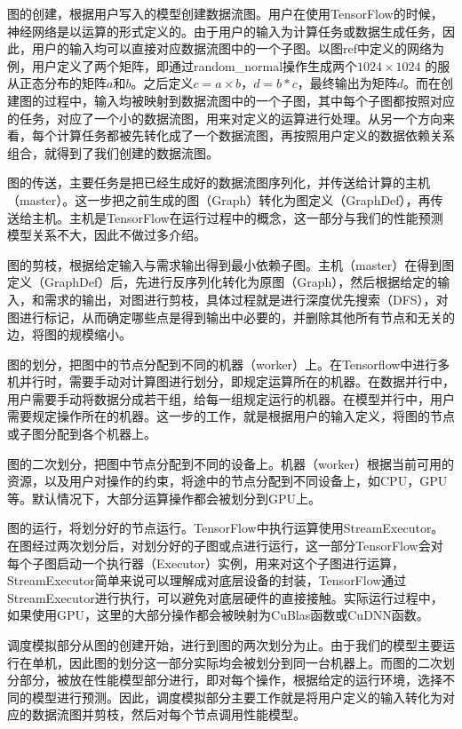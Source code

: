     图的创建，根据用户写入的模型创建数据流图。用户在使用TensorFlow的时候，神经网络是以运算的形式定义的。由于用户的输入为计算任务或数据生成任务，因此，用户的输入均可以直接对应数据流图中的一个子图。以图ref中定义的网络为例，用户定义了两个矩阵，即通过random\_normal操作生成两个$ 1024 \times 1024 $ 的服从正态分布的矩阵$ a $和$ b $。之后定义$ c = a \times b $，$ d = b * c $，最终输出为矩阵$ d $。而在创建图的过程中，输入均被映射到数据流图中的一个子图，其中每个子图都按照对应的任务，对应了一个小的数据流图，用来对定义的运算进行处理。从另一个方向来看，每个计算任务都被先转化成了一个数据流图，再按照用户定义的数据依赖关系组合，就得到了我们创建的数据流图。
    
    图的传送，主要任务是把已经生成好的数据流图序列化，并传送给计算的主机（master）。这一步把之前生成的图（Graph）转化为图定义（GraphDef），再传送给主机。主机是TensorFlow在运行过程中的概念，这一部分与我们的性能预测模型关系不大，因此不做过多介绍。
    
    图的剪枝，根据给定输入与需求输出得到最小依赖子图。主机（master）在得到图定义（GraphDef）后，先进行反序列化转化为原图（Graph），然后根据给定的输入，和需求的输出，对图进行剪枝，具体过程就是进行深度优先搜索（DFS），对图进行标记，从而确定哪些点是得到输出中必要的，并删除其他所有节点和无关的边，将图的规模缩小。
    
    图的划分，把图中的节点分配到不同的机器（worker）上。在Tensorflow中进行多机并行时，需要手动对计算图进行划分，即规定运算所在的机器。在数据并行中，用户需要手动将数据分成若干组，给每一组规定运行的机器。在模型并行中，用户需要规定操作所在的机器。这一步的工作，就是根据用户的输入定义，将图的节点或子图分配到各个机器上。
    
    图的二次划分，把图中节点分配到不同的设备上。机器（worker）根据当前可用的资源，以及用户对操作的约束，将途中的节点分配到不同设备上，如CPU，GPU等。默认情况下，大部分运算操作都会被划分到GPU上。
    
    图的运行，将划分好的节点运行。TensorFlow中执行运算使用StreamExecutor。在图经过两次划分后，对划分好的子图或点进行运行，这一部分TensorFlow会对每个子图启动一个执行器（Executor）实例，用来对这个子图进行运算，StreamExecutor简单来说可以理解成对底层设备的封装，TensorFlow通过StreamExecutor进行执行，可以避免对底层硬件的直接接触。实际运行过程中，如果使用GPU，这里的大部分操作都会被映射为CuBlas函数或CuDNN\cite{cudnn}函数。
    
    调度模拟部分从图的创建开始，进行到图的两次划分为止。由于我们的模型主要运行在单机，因此图的划分这一部分实际均会被划分到同一台机器上。而图的二次划分部分，被放在性能模型部分进行，即对每个操作，根据给定的运行环境，选择不同的模型进行预测。因此，调度模拟部分主要工作就是将用户定义的输入转化为对应的数据流图并剪枝，然后对每个节点调用性能模型。

